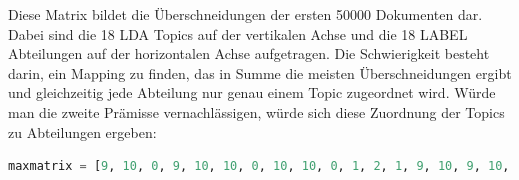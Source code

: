 \documentclass[german,version-2020-11]{uzl-thesis}
\begin{document}
\begin{enumerate}



Diese Matrix bildet die Überschneidungen der ersten 50000 Dokumenten dar. Dabei sind die 18 LDA Topics auf der vertikalen Achse und die 18 LABEL Abteilungen auf der horizontalen Achse aufgetragen. Die Schwierigkeit besteht darin, ein Mapping zu finden, das in Summe die meisten Überschneidungen ergibt und gleichzeitig jede Abteilung nur genau einem Topic zugeordnet wird. Würde man die zweite Prämisse vernachlässigen, würde sich diese Zuordnung der Topics zu Abteilungen ergeben: \\

\begin{lstlisting}[language=Python]
maxmatrix = [9, 10, 0, 9, 10, 10, 0, 10, 10, 0, 1, 2, 1, 9, 10, 9, 10, 9] TODO UPDATEN
\end{lstlisting}\\


\end{enumerate}
\end{document}
